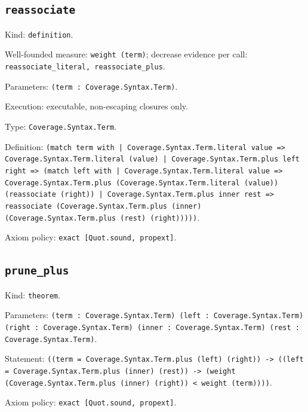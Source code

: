 \documentclass[11pt]{article}
\begin{document}
\subsection*{\texttt{reassociate}}
\noindent Kind: \texttt{definition}.\par
\noindent Well-founded measure: \texttt{weight (term)}; decrease evidence per call: \texttt{reassociate\_literal, reassociate\_plus}.\par
\noindent Parameters: \texttt{(term : Coverage.Syntax.Term)}.\par
\noindent Execution: executable, non-escaping closures only.\par
\noindent Type: \texttt{Coverage.Syntax.Term}.\par
\noindent Definition: \texttt{(match term with | Coverage.Syntax.Term.literal value => Coverage.Syntax.Term.literal (value) | Coverage.Syntax.Term.plus left right => (match left with | Coverage.Syntax.Term.literal value => Coverage.Syntax.Term.plus (Coverage.Syntax.Term.literal (value)) (reassociate (right)) | Coverage.Syntax.Term.plus inner rest => reassociate (Coverage.Syntax.Term.plus (inner) (Coverage.Syntax.Term.plus (rest) (right)))))}.\par
\noindent Axiom policy: \texttt{exact [Quot.sound, propext]}.\par
\subsection*{\texttt{prune\_plus}}
\noindent Kind: \texttt{theorem}.\par
\noindent Parameters: \texttt{(term : Coverage.Syntax.Term) (left : Coverage.Syntax.Term) (right : Coverage.Syntax.Term) (inner : Coverage.Syntax.Term) (rest : Coverage.Syntax.Term)}.\par
\noindent Statement: \texttt{((term = Coverage.Syntax.Term.plus (left) (right)) -> ((left = Coverage.Syntax.Term.plus (inner) (rest)) -> (weight (Coverage.Syntax.Term.plus (inner) (right)) < weight (term))))}.\par
\noindent Axiom policy: \texttt{exact [Quot.sound, propext]}.\par
\end{document}
